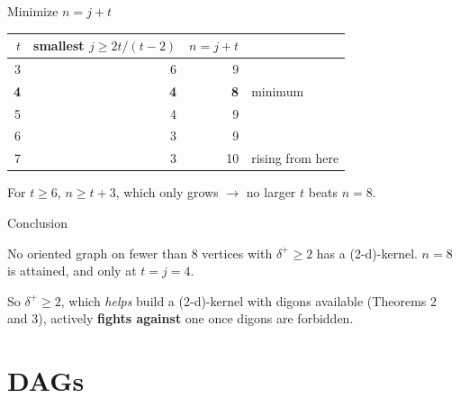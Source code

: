 \documentclass[11pt]{beamer}
\begin{document}
\begin{frame}{Minimize $n = j + t$}
  \begin{center}
    \begin{tabular}{@{}rrrl@{}}
      \toprule
      $t$        & smallest $j \ge 2t/(t{-}2)$ & $n=j+t$    &                  \\
      \midrule
      3          & 6                           & 9          &                  \\
      \textbf{4} & \textbf{4}                  & \textbf{8} & minimum          \\
      5          & 4                           & 9          &                  \\
      6          & 3                           & 9          &                  \\
      7          & 3                           & 10         & rising from here \\
      \bottomrule
    \end{tabular}
  \end{center}

  \bigskip
  For $t \ge 6$, $n \ge t + 3$, which only grows $\rightarrow$ no larger $t$ beats $n=8$.
\end{frame}

\begin{frame}{Conclusion}
  \begin{theorem}
    No oriented graph on fewer than 8 vertices with $\delta^+ \ge 2$ has a
    (2-d)-kernel. $n = 8$ is attained, and only at $t = j = 4$.
  \end{theorem}

  \bigskip
  So $\delta^+ \ge 2$, which \emph{helps} build a (2-d)-kernel with digons
  available (Theorems 2 and 3), actively \textbf{fights against} one once digons
  are forbidden.
\end{frame}

\section{DAGs}
\end{document}
